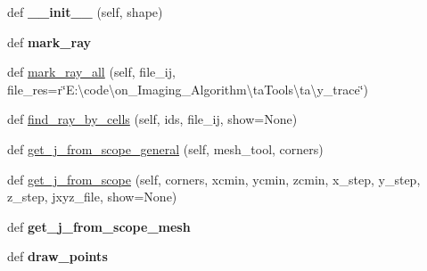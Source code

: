 \begin{DoxyCompactItemize}
\item 
\mbox{\label{classMIS_1_1Muon__Imaging__Algorithm_1_1InvDataTools_1_1show__ray__trace__tools_1_1show__ray__trace__tools_a5e6a8c24a799f3885caa31141fc691cc}} 
def {\bfseries \+\_\+\+\_\+init\+\_\+\+\_\+} (self, shape)
\item 
\mbox{\label{classMIS_1_1Muon__Imaging__Algorithm_1_1InvDataTools_1_1show__ray__trace__tools_1_1show__ray__trace__tools_abbca66c86f2e8b1ed2a2e59c7e6b52b5}} 
def {\bfseries mark\+\_\+ray}
\item 
def \hyperlink{classMIS_1_1Muon__Imaging__Algorithm_1_1InvDataTools_1_1show__ray__trace__tools_1_1show__ray__trace__tools_a7fd3a305dd71a89e1161d757d26743f5}{mark\+\_\+ray\+\_\+all} (self, file\+\_\+ij, file\+\_\+res=r\char`\"{}E\+:\textbackslash{}code\textbackslash{}on\+\_\+\+Imaging\+\_\+\+Algorithm\textbackslash{}ta\+Tools\textbackslash{}ta\textbackslash{}y\+\_\+trace\char`\"{})
\item 
def \hyperlink{classMIS_1_1Muon__Imaging__Algorithm_1_1InvDataTools_1_1show__ray__trace__tools_1_1show__ray__trace__tools_abef0ed1d1c5c54256f361fe6db150542}{find\+\_\+ray\+\_\+by\+\_\+cells} (self, ids, file\+\_\+ij, show=None)
\item 
def \hyperlink{classMIS_1_1Muon__Imaging__Algorithm_1_1InvDataTools_1_1show__ray__trace__tools_1_1show__ray__trace__tools_a9e4c3d47a007978770bda252efad06ea}{get\+\_\+j\+\_\+from\+\_\+scope\+\_\+general} (self, mesh\+\_\+tool, corners)
\item 
def \hyperlink{classMIS_1_1Muon__Imaging__Algorithm_1_1InvDataTools_1_1show__ray__trace__tools_1_1show__ray__trace__tools_ae93713e0b606a1ccd6123be3394c1a1a}{get\+\_\+j\+\_\+from\+\_\+scope} (self, corners, xcmin, ycmin, zcmin, x\+\_\+step, y\+\_\+step, z\+\_\+step, jxyz\+\_\+file, show=None)
\item 
\mbox{\label{classMIS_1_1Muon__Imaging__Algorithm_1_1InvDataTools_1_1show__ray__trace__tools_1_1show__ray__trace__tools_aea63482d211894858fc7e5928ad40232}} 
def {\bfseries get\+\_\+j\+\_\+from\+\_\+scope\+\_\+mesh}
\item 
\mbox{\label{classMIS_1_1Muon__Imaging__Algorithm_1_1InvDataTools_1_1show__ray__trace__tools_1_1show__ray__trace__tools_a2a0a8af71098a117c55363163ee7799c}} 
def {\bfseries draw\+\_\+points}
\end{DoxyCompactItemize}
